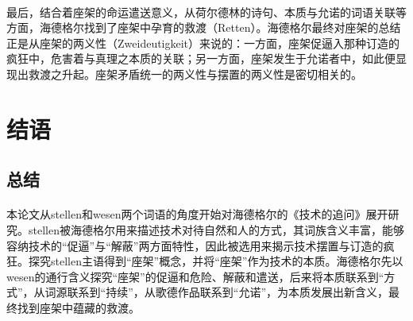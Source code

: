 \documentclass{article}
\begin{document}
		\paragraph{}
		最后，结合着座架的命运遣送意义，从荷尔德林的诗句、本质与允诺的词语关联等方面，海德格尔找到了座架中孕育的救渡（Retten）。海德格尔最终对座架的总结正是从座架的两义性（Zweideutigkeit）来说的：一方面，座架促逼入那种订造的疯狂中，危害着与真理之本质的关联；另一方面，座架发生于允诺者中，如此便显现出救渡之升起。座架矛盾统一的两义性与摆置的两义性是密切相关的。
\section{结语}
	\subsection{总结}
		\paragraph{}
		本论文从stellen和wesen两个词语的角度开始对海德格尔的《技术的追问》展开研究。stellen被海德格尔用来描述技术对待自然和人的方式，其词族含义丰富，能够容纳技术的“促逼”与“解蔽”两方面特性，因此被选用来揭示技术摆置与订造的疯狂。探究stellen主语得到“座架”概念，并将“座架”作为技术的本质。海德格尔先以wesen的通行含义探究“座架”的促逼和危险、解蔽和遣送，后来将本质联系到“方式”，从词源联系到“持续”，从歌德作品联系到“允诺”，为本质发展出新含义，最终找到座架中蕴藏的救渡。
\end{document}
